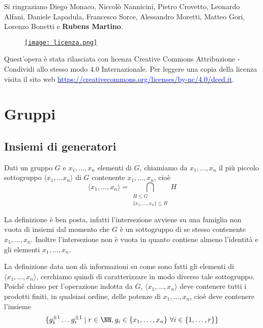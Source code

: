 \documentclass[11pt]{scrartcl}
\begin{document}
	Si ringraziano Diego Monaco, Niccolò Nannicini, Pietro Crovetto, Leonardo Alfani,
	Daniele Lapadula, Francesco Sorce, Alessandro Moretti, Matteo Gori, Lorenzo Bonetti e \textbf{Rubens Martino}.
	
	\mbox{}
	\vfill
	\begin{wrapfigure}{R}{0.2\textwidth}
		\centering
		\href{https://creativecommons.org/licenses/by-nc/4.0/deed.it}{\texttt{[image: licenza.png]}}
	\end{wrapfigure}
	
	Quest'opera è stata rilasciata con licenza Creative Commons Attribuzione - Condividi allo stesso modo 4.0 Internazionale. Per leggere
	una copia della licenza visita il sito web \href{http://creativecommons.org/licenses/by-sa/4.0/deed.it}{\textcolor{blue}{https://creativecommons.org/licenses/by-nc/4.0/deed.it}}.\\
	
	\newpage
	
	\section{Gruppi}
	
	\subsection{Insiemi di generatori}
	
	\begin{definition}
		Dati un gruppo $G$ e $x_1, \ldots, x_n$ elementi di $G$, chiamiamo  da $x_1, \ldots, x_n$ il più piccolo sottogruppo $\langle x_1, \ldots x_n
		\rangle$ di $G$ contenente $x_1, \ldots, x_n$, cioè \[\langle x_1, \ldots, x_n\rangle =
		\bigcap_{\substack{H\leqslant G\\ \{x_1, \ldots, x_n\} \subseteq H}} H\] 
	\end{definition}
	
	\begin{remark}
		La definizione è ben posta, infatti l'intersezione avviene su una 
		famiglia non vuota di insiemi dal momento che $G$ è un sottogruppo di 
		se stesso contenente $x_1, \ldots, x_n$. Inoltre l'intersezione non è vuota in 
		quanto contiene almeno l'identità e gli elementi $x_1, \ldots, x_n$.
	\end{remark}
	
	La definizione data non dà informazioni su come sono fatti gli elementi di 
	$\langle x_1, \ldots, x_n\rangle$, cerchiamo quindi di caratterizzare in modo
	diverso tale sottogruppo. Poiché chiuso per l'operazione indotta da $G$, $\langle x_1, \ldots, x_n\rangle$
	deve contenere tutti i prodotti finiti, in qualsiasi ordine, delle potenze di
	$x_1, \ldots, x_n$, cioè deve contenere l'insieme 
	\[\{g_1^{\pm 1} \ldots g_r^{\pm 1}\mid r \in \NN, g_i \in \{x_1, \ldots, x_n\}
	~\forall i \in \{1, \ldots, r\}\}\]
	
\end{document}
